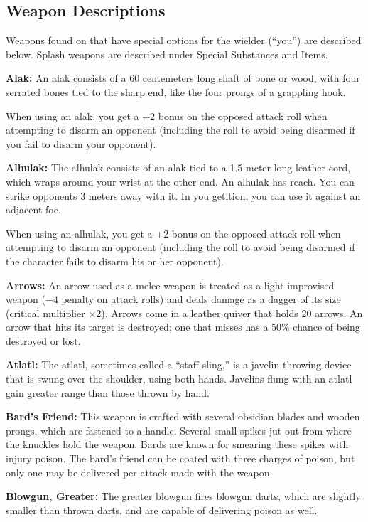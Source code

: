 \subsection{Weapon Descriptions}
Weapons found on  that have special options for the wielder (``you'') are described below. Splash weapons are described under Special Substances and Items.

\textbf{Alak:} An alak consists of a 60 centemeters long shaft of bone or wood, with four serrated bones tied to the sharp end, like the four prongs of a grappling hook.

When using an alak, you get a +2 bonus on the opposed attack roll when attempting to disarm an opponent (including the roll to avoid being disarmed if you fail to disarm your opponent). 

\textbf{Alhulak:} The alhulak consists of an alak tied to a 1.5 meter long leather cord, which wraps around your wrist at the other end. An alhulak has reach. You can strike opponents 3 meters away with it. In you getition, you can use it against an adjacent foe.

When using an alhulak, you get a +2 bonus on the opposed attack roll when attempting to disarm an opponent (including the roll to avoid being disarmed if the character fails to disarm his or her opponent). 

\textbf{Arrows:} An arrow used as a melee weapon is treated as a light improvised weapon ($-4$ penalty on attack rolls) and deals damage as a dagger of its size (critical multiplier $\times$2). Arrows come in a leather quiver that holds 20 arrows. An arrow that hits its target is destroyed; one that misses has a 50\% chance of being destroyed or lost. 

\textbf{Atlatl:} The atlatl, sometimes called a ``staff-sling,'' is a javelin-throwing device that is swung over the shoulder, using both hands. Javelins flung with an atlatl gain greater range than those thrown by hand. 

\textbf{Bard's Friend:} This weapon is crafted with several obsidian blades and wooden prongs, which are fastened to a handle. Several small spikes jut out from where the knuckles hold the weapon. Bards are known for smearing these spikes with injury poison. The bard's friend can be coated with three charges of poison, but only one may be delivered per attack made with the weapon. 

\textbf{Blowgun, Greater:} The greater blowgun fires blowgun darts, which are slightly smaller than thrown darts, and are capable of delivering poison as well. 

